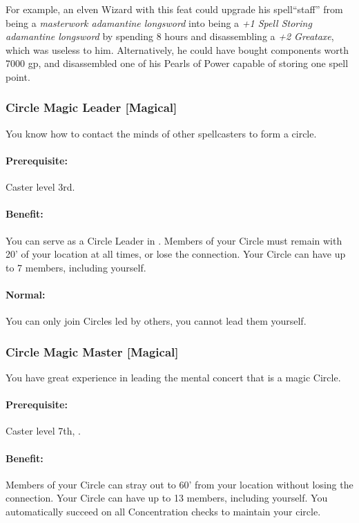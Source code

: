 For example, an elven Wizard with this feat could upgrade his spell``staff'' from being a 
\emph{masterwork adamantine longsword} into being a \emph{+1 Spell Storing adamantine longsword} by spending 8 hours and %
disassembling a \emph{+2 Greataxe}, which was useless to him.
Alternatively, he could have bought components worth 7000 gp, and disassembled one of his Pearls of Power capable of storing one spell point.

\subsubsection[Circle Magic Leader]{Circle Magic Leader [Magical]}
\label{Feat:CircleMagicLeader}
You know how to contact the minds of other spellcasters to form a circle.
\paragraph{Prerequisite:} Caster level 3rd.
\paragraph{Benefit:} You can serve as a Circle Leader in . Members of your Circle must remain with 20' of your location at all times, or lose the connection. Your Circle can have up to 7 members, including yourself.
\paragraph{Normal:} You can only join Circles led by others, you cannot lead them yourself.

\subsubsection[Circle Magic Master]{Circle Magic Master [Magical]}
\label{Feat:CircleMagicMaster}
You have great experience in leading the mental concert that is a magic Circle.
\paragraph{Prerequisite:} Caster level 7th, .
\paragraph{Benefit:} Members of your Circle can stray out to 60' from your location without losing the connection. Your Circle can have up to 13 members, including yourself. You automatically succeed on all Concentration checks to maintain your circle.

